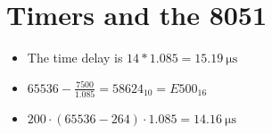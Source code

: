 \documentclass[12pt]{article}
\begin{document}
\section{Timers and the 8051}
\begin{itemize}
    \item The time delay is $14 * 1.085 = \SI{15.19}{\micro\second}$
    \item $65536 - \frac{7500}{1.085} = 58624_{10} = E500_{16}$
    \item $200 \cdot (65536 - 264) \cdot 1.085 = \SI{14.16}{\micro\second}$
\end{itemize}
\end{document}

